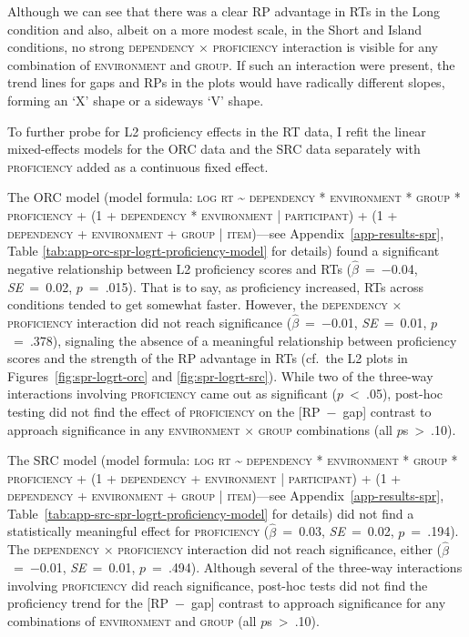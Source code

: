 \noindent Although we can see that there was a clear RP advantage in RTs in the Long condition and also, albeit on a more modest scale, in the Short and Island conditions, no strong \textsc{dependency × proficiency} interaction is visible for any combination of \textsc{environment} and \textsc{group}. If such an interaction were present, the trend lines for gaps and RPs in the plots would have radically different slopes, forming an `X' shape or a sideways `V' shape.

To further probe for L2 proficiency effects in the RT data, I refit the linear mixed-effects models for the ORC data and the SRC data separately with \textsc{proficiency} added as a continuous fixed effect. 

The ORC model (model formula: \textsc{log rt \~{} dependency * environment * group * proficiency + (1 + dependency * environment | participant) + (1 + dependency + environment + group | item)}---see Appendix~\ref{app-results-spr}, Table \ref{tab:app-orc-spr-logrt-proficiency-model} for details) found a significant negative relationship between L2 proficiency scores and RTs ($\hat{\beta}$~=~−0.04, \textit{SE}~=~0.02, $p$~=~.015). That is to say, as proficiency increased, RTs across conditions tended to get somewhat faster. However, the \textsc{dependency} × \textsc{proficiency} interaction did not reach significance ($\hat{\beta}$~=~−0.01, \textit{SE}~=~0.01, $p$~=~.378), signaling the absence of a meaningful relationship between proficiency scores and the strength of the RP advantage in RTs (cf.~the L2 plots in Figures~\ref{fig:spr-logrt-orc} and \ref{fig:spr-logrt-src}). While two of the three-way interactions involving \textsc{proficiency} came out as significant ($p$~<~.05), post-hoc testing did not find the effect of \textsc{proficiency} on the [RP~−~gap] contrast to approach significance in any \textsc{environment} × \textsc{group} combinations (all $p$s~>~.10).

The SRC model (model formula: \textsc{log rt \~{} dependency * environment * group * proficiency + (1 + dependency + environment | participant) + (1 + dependency + environment + group | item)}---see Appendix~\ref{app-results-spr}, Table~\ref{tab:app-src-spr-logrt-proficiency-model} for details) did not find a statistically meaningful effect for \textsc{proficiency} ($\hat{\beta}$~=~0.03, \textit{SE}~=~0.02, $p$~=~.194). The \textsc{dependency × proficiency} interaction did not reach significance, either ($\hat{\beta}$~=~−0.01, \textit{SE}~=~0.01, $p$~=~.494). Although several of the three-way interactions involving \textsc{proficiency} did reach significance, post-hoc tests did not find the proficiency trend for the [RP~−~gap] contrast to approach significance for any combinations of \textsc{environment} and \textsc{group} (all $p$s~>~.10). 

